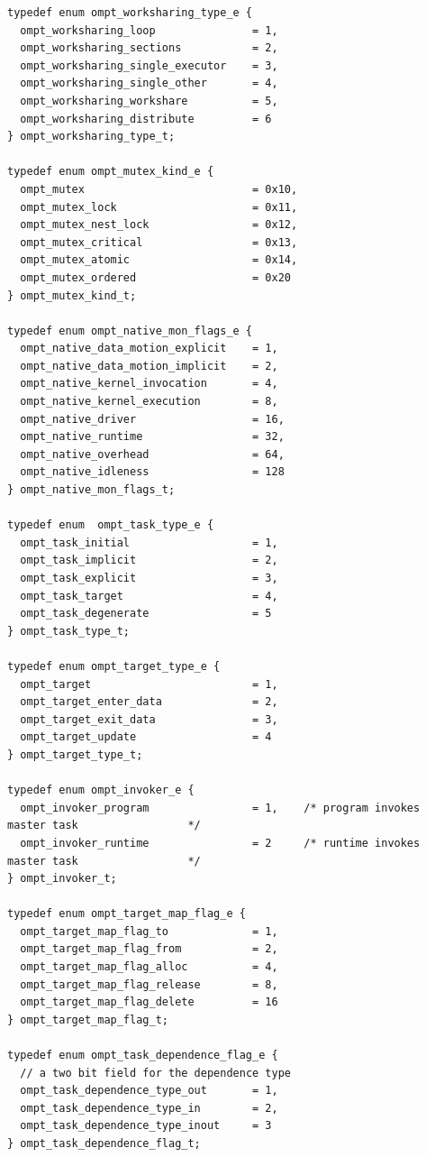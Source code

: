 \documentclass{article}
\begin{document}
\begin{verbatim}
typedef enum ompt_worksharing_type_e {
  ompt_worksharing_loop               = 1, 
  ompt_worksharing_sections           = 2,
  ompt_worksharing_single_executor    = 3,
  ompt_worksharing_single_other       = 4,
  ompt_worksharing_workshare          = 5,
  ompt_worksharing_distribute         = 6
} ompt_worksharing_type_t;

typedef enum ompt_mutex_kind_e {
  ompt_mutex                          = 0x10,
  ompt_mutex_lock                     = 0x11,
  ompt_mutex_nest_lock                = 0x12,
  ompt_mutex_critical                 = 0x13,
  ompt_mutex_atomic                   = 0x14,
  ompt_mutex_ordered                  = 0x20
} ompt_mutex_kind_t;

typedef enum ompt_native_mon_flags_e {
  ompt_native_data_motion_explicit    = 1,
  ompt_native_data_motion_implicit    = 2,
  ompt_native_kernel_invocation       = 4,
  ompt_native_kernel_execution        = 8,
  ompt_native_driver                  = 16,
  ompt_native_runtime                 = 32,
  ompt_native_overhead                = 64,
  ompt_native_idleness                = 128
} ompt_native_mon_flags_t;

typedef enum  ompt_task_type_e {
  ompt_task_initial                   = 1,
  ompt_task_implicit                  = 2,
  ompt_task_explicit                  = 3,
  ompt_task_target                    = 4,
  ompt_task_degenerate                = 5
} ompt_task_type_t;

typedef enum ompt_target_type_e {
  ompt_target                         = 1,
  ompt_target_enter_data              = 2,
  ompt_target_exit_data               = 3,
  ompt_target_update                  = 4
} ompt_target_type_t;

typedef enum ompt_invoker_e {
  ompt_invoker_program                = 1,    /* program invokes master task                 */
  ompt_invoker_runtime                = 2     /* runtime invokes master task                 */
} ompt_invoker_t;

typedef enum ompt_target_map_flag_e {
  ompt_target_map_flag_to             = 1,
  ompt_target_map_flag_from           = 2,
  ompt_target_map_flag_alloc          = 4,
  ompt_target_map_flag_release        = 8, 
  ompt_target_map_flag_delete         = 16
} ompt_target_map_flag_t;

typedef enum ompt_task_dependence_flag_e {
  // a two bit field for the dependence type
  ompt_task_dependence_type_out       = 1,
  ompt_task_dependence_type_in        = 2,
  ompt_task_dependence_type_inout     = 3
} ompt_task_dependence_flag_t;


\end{verbatim}
\end{document}
